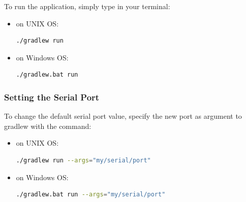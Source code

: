 \documentclass[12pt, letterpaper, twoside]{article}
\begin{document}
To run the application, simply type in your terminal:

\begin{itemize}
    \item on UNIX OS:
\begin{lstlisting}[language=Bash]
./gradlew run
\end{lstlisting}

    \item on Windows OS:
\begin{lstlisting}[language=Bash]
./gradlew.bat run
\end{lstlisting}
\end{itemize}

\subsubsection{Setting the Serial Port}

To change the default serial port value, specify the new port as argument to gradlew with the command:

\begin{itemize}
    \item on UNIX OS:
\begin{lstlisting}[language=Bash]
./gradlew run --args="my/serial/port"
\end{lstlisting}

    \item on Windows OS:
\begin{lstlisting}[language=Bash]
./gradlew.bat run --args="my/serial/port"
\end{lstlisting}
\end{itemize}




% 
% 
\end{document}
